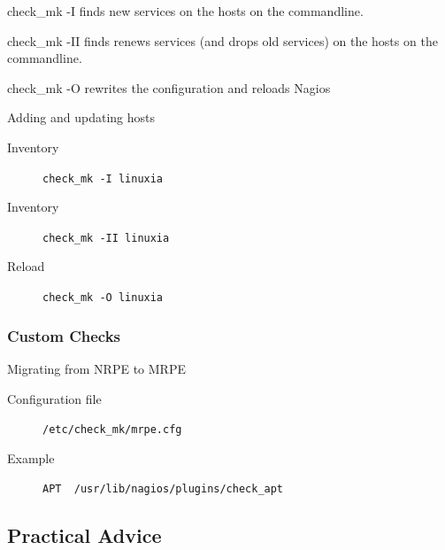 check\_mk -I finds new services on the hosts on the commandline.

check\_mk -II finds renews services (and drops old services) 
on the hosts on the commandline.

check\_mk -O rewrites the configuration and reloads Nagios

\begin{frame}[fragile]{Adding and updating hosts}
\begin{description}
\item[Inventory] \verb|check_mk -I linuxia|
\item[Inventory] \verb|check_mk -II linuxia|
\item[Reload] \verb|check_mk -O linuxia|
\end{description}
\end{frame}




\subsubsection{Custom Checks}

\begin{frame}[fragile]{Migrating from NRPE to MRPE}
\begin{description}
\item[Configuration file] \verb|/etc/check_mk/mrpe.cfg|
\item[Example] \verb|APT  /usr/lib/nagios/plugins/check_apt|
\end{description}
\end{frame}

\subsection{Practical Advice}

